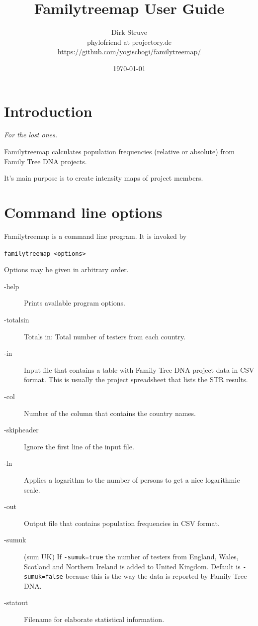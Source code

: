 \documentclass[12pt,a4paper]{article}
\begin{document}
\title{Familytreemap User Guide}
\author{Dirk Struve\\
phylofriend at projectory.de\\
\href{https://github.com/yogischogi/familytreemap/}{https://github.com/yogischogi/familytreemap/}}
\date{\today}
\maketitle
\tableofcontents


\section{Introduction}

\hfill {\sl For the lost ones.}
\vspace{1em}

\noindent
Familytreemap calculates population frequencies
(relative or absolute) from Family Tree DNA projects.

It's main purpose is to create intensity maps of project members.


\section{Command line options}

Familytreemap is a command line program. It is invoked by

\vspace{1em}
\noindent\texttt{familytreemap <options>}

\vspace{1em}
\noindent Options may be given in arbitrary order.

\begin{description}
\item[-help] Prints available program options.
\item[-totalsin] Totals in: Total number of testers from each country.
\item[-in] Input file that contains a table with Family Tree DNA
  project data in CSV format. This is usually the project spreadsheet
  that lists the STR results.
\item[-col] Number of the column that contains the country names.
\item[-skipheader] Ignore the first line of the input file.
\item[-ln] Applies a logarithm to the number of persons to get a nice logarithmic scale.
\item[-out] Output file that contains population frequencies in
  CSV format.
\item[-sumuk] (sum UK) If \texttt{-sumuk=true} the number of
  testers from England, Wales, Scotland and Northern Ireland
  is added to United Kingdom. Default is \texttt{-sumuk=false}
  because this is the way the data is reported by Family Tree DNA.
\item[-statout] Filename for elaborate statistical information.
\end{description}
\end{document}
